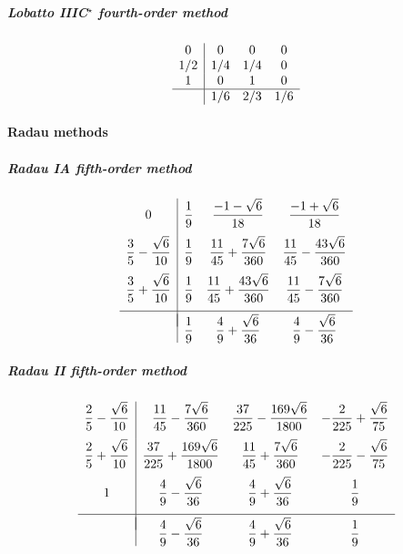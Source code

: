 \subparagraph{Lobatto IIIC$^\star$ fourth-order method}
\begin{equation}
	\begin{array}{c|ccc}
		 0  &  0  &  0  &  0  \\
		1/2 & 1/4 & 1/4 &  0  \\
		 1  &  0  &  1  &  0  \\ \hline
		    & 1/6 & 2/3 & 1/6
	\end{array}
	\label{eq::lobattoiic_star}
\end{equation}

\paragraph{Radau methods}

\subparagraph{Radau IA fifth-order method}
\begin{equation}
	\begin{array}{c|ccc}
		0 &
		    \dfrac{1}{9} &
		        \dfrac{-1 - \sqrt{6}}{18} &
		            \dfrac{-1 + \sqrt{6}}{18} \\[1em]
		\dfrac{3}{5} - \dfrac{\sqrt{6}}{10} &
		    \dfrac{1}{9} &
		        \dfrac{11}{45} + \dfrac{7\sqrt{6}}{360} &
		            \dfrac{11}{45} - \dfrac{43\sqrt{6}}{360}\\[1em]
		\dfrac{3}{5} + \dfrac{\sqrt{6}}{10} &
		    \dfrac{1}{9} &
		        \dfrac{11}{45} + \dfrac{43\sqrt{6}}{360} &
		            \dfrac{11}{45} - \dfrac{7\sqrt{6}}{360} \\[1em]
		\hline\\[-1em]
		& \dfrac{1}{9}
		& \dfrac{4}{9} + \dfrac{\sqrt{6}}{36}
		& \dfrac{4}{9} - \dfrac{\sqrt{6}}{36}
	\end{array}
	\label{eq::radauia}
\end{equation}

\subparagraph{Radau II fifth-order method}
\begin{equation}
	\begin{array}{c|ccc}
		\dfrac{2}{5} - \dfrac{\sqrt{6}}{10} &
		    \dfrac{11}{45} - \dfrac{7\sqrt{6}}{360} &
		        \dfrac{37}{225} - \dfrac{169\sqrt{6}}{1800} &
		            -\dfrac{2}{225} + \dfrac{\sqrt{6}}{75} \\[1em]
		\dfrac{2}{5} + \dfrac{\sqrt{6}}{10} &
		    \dfrac{37}{225} + \dfrac{169\sqrt{6}}{1800} &
		        \dfrac{11}{45} + \dfrac{7\sqrt{6}}{360} &
		            -\dfrac{2}{225} - \dfrac{\sqrt{6}}{75}\\[1em]
		1 &
		    \dfrac{4}{9} - \dfrac{\sqrt{6}}{36} &
		        \dfrac{4}{9} + \dfrac{\sqrt{6}}{36} &
		            \dfrac{1}{9} \\[1em]
		\hline\\[-1em]
		& \dfrac{4}{9} - \dfrac{\sqrt{6}}{36}
		& \dfrac{4}{9} + \dfrac{\sqrt{6}}{36}
		& \dfrac{1}{9}
	\end{array}
	\label{eq::radauiia}
\end{equation}

